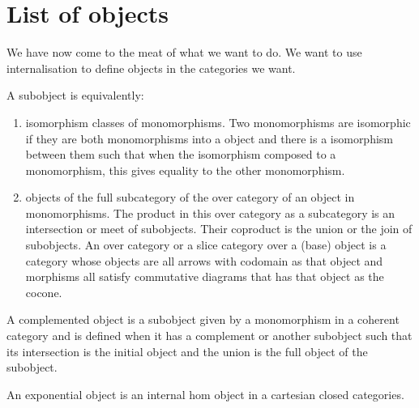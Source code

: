 \section{List of objects}

We have now come to the meat of what we want to do.
We want to use internalisation to define objects in the categories we want.

\begin{definition}[Subobject]
    \label{definition-subobject}
    A subobject is equivalently:
    \begin{enumerate}
        \item isomorphism classes of monomorphisms. Two monomorphisms are isomorphic if they are both monomorphisms into a object and there is a isomorphism between them such that when the isomorphism composed to a monomorphism, this gives equality to the other monomorphism.
        \item objects of the full subcategory of the over category of an object in monomorphisms. 
		The product in this over category as a subcategory is an intersection or meet of subobjects.
		Their coproduct is the union or the join of subobjects. 
		An over category or a slice category over a (base) object is a category whose objects are all arrows with codomain as that object and morphisms all satisfy commutative diagrams that has that object as the cocone.
    \end{enumerate}
\end{definition}

\begin{definition}
    \label{definition-complemented-object}
    A complemented object is a subobject given by a monomorphism in a coherent category and is defined when it has a complement or another subobject such that its intersection is the initial object and the union is the full object of the subobject.
\end{definition}

\begin{definition}
    \label{definition-exponential-object}
    An exponential object is an internal hom object in a cartesian closed categories.
\end{definition}

